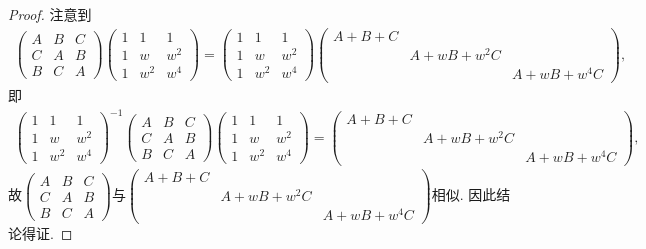 \documentclass[../../main.tex]{subfiles}%
\begin{document}
\begin{proof}

注意到
\begin{align*}
\begin{pmatrix}
A & B & C \\
C & A & B \\
B & C & A
\end{pmatrix}
\begin{pmatrix}
1 & 1 & 1 \\
1 & w & w^2 \\
1 & w^2 & w^4
\end{pmatrix}
=
\begin{pmatrix}
1 & 1 & 1 \\
1 & w & w^2 \\
1 & w^2 & w^4
\end{pmatrix}
\begin{pmatrix}
A+B+C & & \\
& A+wB+w^2C & \\
& & A+wB+w^4C
\end{pmatrix},
\end{align*}
即
\begin{align*}
\begin{pmatrix}
1 & 1 & 1 \\
1 & w & w^2 \\
1 & w^2 & w^4
\end{pmatrix}^{-1}
\begin{pmatrix}
A & B & C \\
C & A & B \\
B & C & A
\end{pmatrix}
\begin{pmatrix}
1 & 1 & 1 \\
1 & w & w^2 \\
1 & w^2 & w^4
\end{pmatrix}
=
\begin{pmatrix}
A+B+C & & \\
& A+wB+w^2C & \\
& & A+wB+w^4C
\end{pmatrix},
\end{align*}
故$\begin{pmatrix}
A & B & C \\
C & A & B \\
B & C & A
\end{pmatrix}$与$\begin{pmatrix}
A+B+C & & \\
& A+wB+w^2C & \\
& & A+wB+w^4C
\end{pmatrix}$相似. 因此结论得证.

\end{proof}
\end{document}
